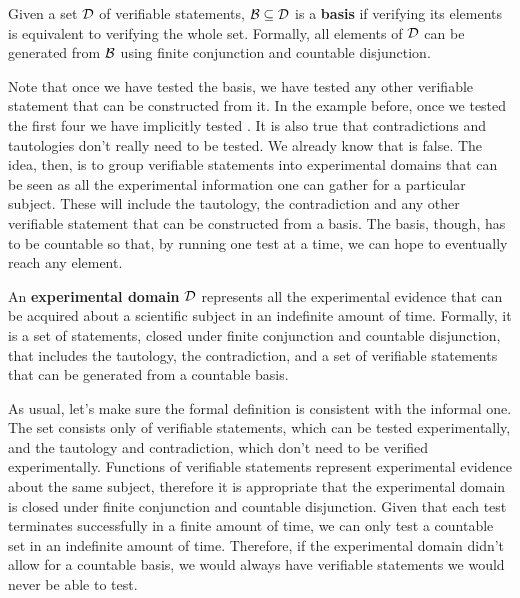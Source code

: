 \documentclass[11pt,letterpaper,fleqn]{memoir} %
\begin{document}
\begin{mathSection}
	\begin{defn}
		Given a set $\mathcal{D}$ of verifiable statements, $\mathcal{B} \subseteq \mathcal{D}$ is a \textbf{basis} if verifying its elements is equivalent to verifying the whole set. Formally, all elements of $\mathcal{D}$ can be generated from $\mathcal{B}$ using finite conjunction and countable disjunction.
	\end{defn}
\end{mathSection}

Note that once we have tested the basis, we have tested any other verifiable statement that can be constructed from it. In the example before, once we tested the first four we have implicitly tested . It is also true that contradictions and tautologies don't really need to be tested. We already know that  is false. The idea, then, is to group verifiable statements into experimental domains that can be seen as all the experimental information one can gather for a particular subject. These will include the tautology, the contradiction and any other verifiable statement that can be constructed from a basis. The basis, though, has to be countable so that, by running one test at a time, we can hope to eventually reach any element.

\begin{mathSection}
\begin{defn}
	An \textbf{experimental domain} $\mathcal{D}$ represents all the experimental evidence that can be acquired about a scientific subject in an indefinite amount of time. Formally, it is a set of statements, closed under finite conjunction and countable disjunction, that includes the tautology, the contradiction, and a set of verifiable statements that can be generated from a countable basis.
\end{defn}
\begin{justification}
	As usual, let's make sure the formal definition is consistent with the informal one. The set consists only of verifiable statements, which can be tested experimentally, and the tautology and contradiction, which don't need to be verified experimentally. Functions of verifiable statements represent experimental evidence about the same subject, therefore it is appropriate that the experimental domain is closed under finite conjunction and countable disjunction. Given that each test terminates successfully in a finite amount of time, we can only test a countable set in an indefinite amount of time. Therefore, if the experimental domain didn't allow for a countable basis, we would always have verifiable statements we would never be able to test.
\end{justification}
\end{mathSection}
\end{document}
